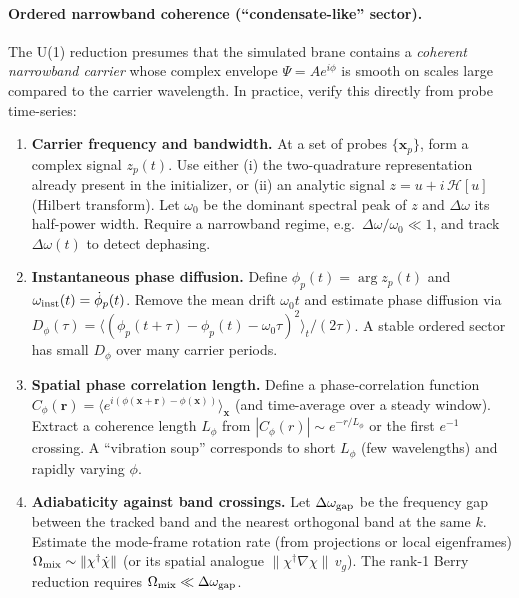 \documentclass[11pt,a4paper]{article}
\newcommand{\x}{\mathbf{x}}                 %
\begin{document}
\paragraph{Ordered narrowband coherence (``condensate-like'' sector).}
The U(1) reduction presumes that the simulated brane contains a \emph{coherent narrowband carrier}
whose complex envelope \(\Psi=Ae^{i\phi}\) is smooth on scales large compared to the carrier wavelength.
In practice, verify this directly from probe time-series:
\begin{enumerate}
  \item \textbf{Carrier frequency and bandwidth.} At a set of probes \(\{\x_p\}\), form a complex signal \(z_p(t)\).
        Use either (i) the two-quadrature representation already present in the initializer, or (ii) an analytic signal
        \(z=u+i\,\mathcal{H}[u]\) (Hilbert transform). Let \(\omega_0\) be the dominant spectral peak of \(z\) and
        \(\Delta\omega\) its half-power width. Require a narrowband regime, e.g.\ \(\Delta\omega/\omega_0\ll 1\),
        and track \(\Delta\omega(t)\) to detect dephasing.
  \item \textbf{Instantaneous phase diffusion.} Define \(\phi_p(t)=\arg z_p(t)\) and \(\omega_{\rm inst}(t)=\dot{\phi}_p(t)\).
        Remove the mean drift \(\omega_0 t\) and estimate phase diffusion via
        \(D_\phi(\tau)=\langle(\phi_p(t+\tau)-\phi_p(t)-\omega_0\tau)^2\rangle_t/(2\tau)\).
        A stable ordered sector has small \(D_\phi\) over many carrier periods.
  \item \textbf{Spatial phase correlation length.} Define a phase-correlation function
        \(C_\phi(\mathbf{r})=\langle e^{i(\phi(\x+\mathbf{r})-\phi(\x))}\rangle_{\x}\) (and time-average over a steady window).
        Extract a coherence length \(L_\phi\) from \(|C_\phi(r)|\sim e^{-r/L_\phi}\) or the first \(e^{-1}\) crossing.
        A ``vibration soup'' corresponds to short \(L_\phi\) (few wavelengths) and rapidly varying \(\phi\).
  \item \textbf{Adiabaticity against band crossings.} Let \(\Delta\omega_{\rm gap}\) be the frequency gap between the tracked band
        and the nearest orthogonal band at the same \(k\). Estimate the mode-frame rotation rate (from projections or local eigenframes)
        \(\Omega_{\rm mix}\sim \|\chi^\dagger \dot{\chi}\|\) (or its spatial analogue \(\|\chi^\dagger \nabla\chi\|\,v_g\)).
        The rank-1 Berry reduction requires \(\Omega_{\rm mix}\ll \Delta\omega_{\rm gap}\).
\end{enumerate}
\end{document}
